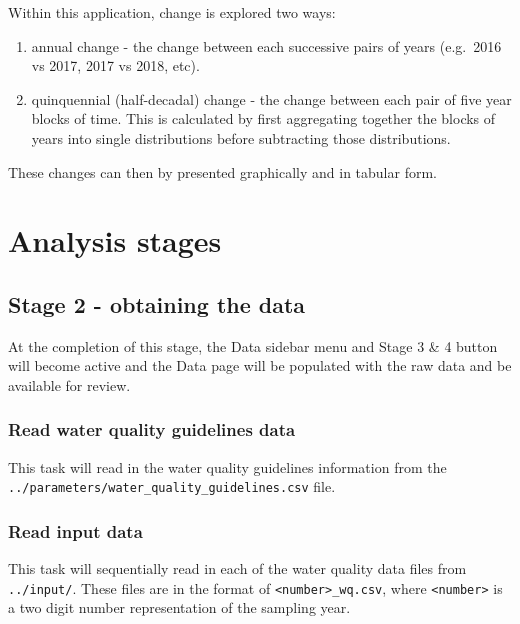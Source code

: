 \documentclass[
  8pt,
  a4paper]{article}
\providecommand{\tightlist}{%
  \setlength{\itemsep}{0pt}\setlength{\parskip}{0pt}}
\begin{document}
Within this application, change is explored two ways:

\begin{enumerate}
\def\labelenumi{\arabic{enumi}.}
\tightlist
\item
  annual change - the change between each successive pairs of years
  (e.g.~2016 vs 2017, 2017 vs 2018, etc).
\item
  quinquennial (half-decadal) change - the change between each pair of
  five year blocks of time. This is calculated by first aggregating
  together the blocks of years into single distributions before
  subtracting those distributions.
\end{enumerate}

These changes can then by presented graphically and in tabular form.

\section{Analysis stages}\label{analysis-stages}

\subsection{Stage 2 - obtaining the
data}\label{stage-2---obtaining-the-data}

At the completion of this stage, the Data sidebar menu and Stage 3 \& 4
button will become active and the Data page will be populated with the
raw data and be available for review.

\subsubsection{Read water quality guidelines
data}\label{read-water-quality-guidelines-data}

This task will read in the water quality guidelines information from
the\\
\texttt{../parameters/water\_quality\_guidelines.csv} file.

\subsubsection{Read input data}\label{read-input-data}

This task will sequentially read in each of the water quality data files
from \texttt{../input/}. These files are in the format of
\texttt{\textless{}number\textgreater{}\_wq.csv}, where
\texttt{\textless{}number\textgreater{}} is a two digit number
representation of the sampling year.
\end{document}
